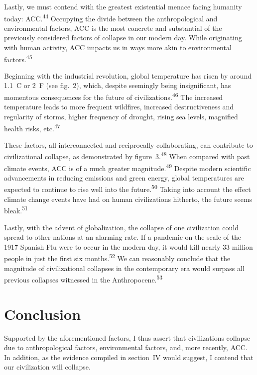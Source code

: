 \documentclass[12pt]{article}
\begin{document}
Lastly, we must contend with the greatest existential menace facing humanity today: ACC.\textsuperscript{44} Occupying the divide between the anthropological and environmental factors, ACC is the most concrete and substantial of the previously considered factors of collapse in our modern day. While originating with human activity, ACC impacts us in ways more akin to environmental factors.\textsuperscript{45}

Beginning with the industrial revolution, global temperature has risen by around 1.1~\textdegree C or 2~\textdegree F (see fig.\ 2), which, despite seemingly being insignificant, has momentous consequences for the future of civilizations.\textsuperscript{46} The increased temperature leads to more frequent wildfires, increased destructiveness and regularity of storms, higher frequency of drought, rising sea levels, magnified health risks, etc.\textsuperscript{47}

These factors, all interconnected and reciprocally collaborating, can contribute to civilizational collapse, as demonstrated by figure~3.\textsuperscript{48} When compared with past climate events, ACC is of a much greater magnitude.\textsuperscript{49} Despite modern scientific advancements in reducing emissions and green energy, global temperatures are expected to continue to rise well into the future.\textsuperscript{50} Taking into account the effect climate change events have had on human civilizations hitherto, the future seems bleak.\textsuperscript{51}

Lastly, with the advent of globalization, the collapse of one civilization could spread to other nations at an alarming rate. If a pandemic on the scale of the 1917 Spanish Flu were to occur in the modern day, it would kill nearly 33 million people in just the first six months.\textsuperscript{52} We can reasonably conclude that the magnitude of civilizational collapses in the contemporary era would surpass all previous collapses witnessed in the Anthropocene.\textsuperscript{53}

\section{Conclusion}

Supported by the aforementioned factors, I thus assert that civilizations collapse due to anthropological factors, environmental factors, and, more recently, ACC. In addition, as the evidence compiled in section~IV would suggest, I contend that our civilization will collapse.
\end{document}
